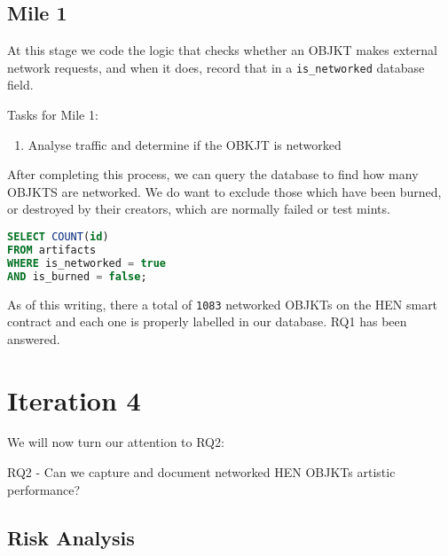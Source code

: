 \subsection {Mile 1}

At this stage we code the logic that checks whether an OBJKT makes external network requests, and when it does, record that in a \texttt{is\_networked} database field.

Tasks for Mile 1:
\begin{enumerate}
	\item Analyse traffic and determine if the OBKJT is networked
\end{enumerate}


After completing this process, we can query the database to find how many OBJKTS are networked. We do want to exclude those which have been burned, or destroyed by their creators, which are normally failed or test mints.

\begin{center}
\begin{lstlisting}[language=SQL, caption={SQL query - number of networked OBJKTs}]
SELECT COUNT(id)
FROM artifacts
WHERE is_networked = true
AND is_burned = false;
\end{lstlisting}
\end{center}

As of this writing, there a total of \texttt{1083} networked OBJKTs on the HEN smart contract and each one is properly labelled in our database. RQ1 has been answered.


\section {Iteration 4}


We will now turn our attention to RQ2:

\vspace{0.5cm}
RQ2 - Can we capture and document networked HEN OBJKTs artistic performance?
\vspace{0.5cm}





















\subsection{Risk Analysis}

